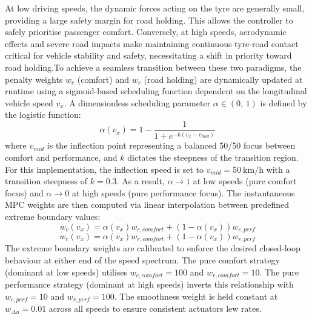 At low driving speeds, the dynamic forces acting on the tyre are generally small, providing a large safety margin for road holding. This allows the controller to safely prioritise passenger comfort. Conversely, at high speeds, aerodynamic effects and severe road impacts make maintaining continuous tyre-road contact critical for vehicle stability and safety, necessitating a shift in priority toward road holding.To achieve a seamless transition between these two paradigms, the penalty weights $w_c$ (comfort) and $w_r$ (road holding) are dynamically updated at runtime using a sigmoid-based scheduling function dependent on the longitudinal vehicle speed $v_x$. A dimensionless scheduling parameter $\alpha \in (0,\,1)$ is defined by the logistic function:\begin{equation}\alpha(v_x) = 1 - \frac{1}{1 + e^{-k(v_x - v_{mid})}}\label{eq:sigmoid_alpha}\end{equation}where $v_{mid}$ is the inflection point representing a balanced 50/50 focus between comfort and performance, and $k$ dictates the steepness of the transition region. For this implementation, the inflection speed is set to $v_{mid} = \SI{50}{\kilo\metre\per\hour}$ with a transition steepness of $k = 0.3$. As a result, $\alpha \to 1$ at low speeds (pure comfort focus) and $\alpha \to 0$ at high speeds (pure performance focus). The instantaneous MPC weights are then computed via linear interpolation between predefined extreme boundary values:\begin{equation}w_c(v_x) = \alpha(v_x) w_{c,comfort} + \left(1 - \alpha(v_x)\right) w_{c,perf}\label{eq:wc_interp}\end{equation}\begin{equation}w_r(v_x) = \alpha(v_x) w_{r,comfort} + \left(1 - \alpha(v_x)\right) w_{r,perf}\label{eq:wr_interp}\end{equation}The extreme boundary weights are calibrated to enforce the desired closed-loop behaviour at either end of the speed spectrum. The pure comfort strategy (dominant at low speeds) utilises $w_{c,comfort} = 100$ and $w_{r,comfort} = 10$. The pure performance strategy (dominant at high speeds) inverts this relationship with $w_{c,perf} = 10$ and $w_{r,perf} = 100$. The smoothness weight is held constant at $w_{\Delta u} = 0.01$ across all speeds to ensure consistent actuators lew rates.

